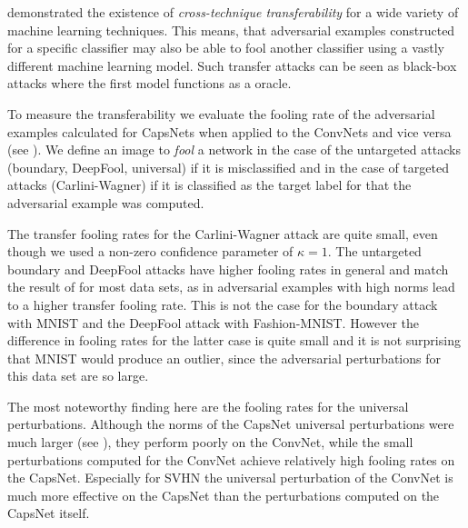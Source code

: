 \citet{transfer} demonstrated the existence of \emph{cross-technique transferability} for a wide variety of machine learning techniques. This means, that adversarial examples constructed for a specific classifier may also be able to fool another classifier using a vastly different machine learning model. Such transfer attacks can be seen as black-box attacks where the first model functions as a oracle.

To measure the transferability we evaluate the fooling rate of the adversarial examples calculated for CapsNets when applied to the ConvNets and vice versa (see ). We define an image to \emph{fool} a network in the case of the untargeted attacks (boundary, DeepFool, universal) if it is misclassified and in the case of targeted attacks (Carlini-Wagner) if it is classified as the target label for that the adversarial example was computed. 

The transfer fooling rates for the Carlini-Wagner attack are quite small, even though we used a non-zero confidence parameter of $\kappa=1$.
The untargeted boundary and DeepFool attacks have higher fooling rates in general and match the result of  for most data sets, as in adversarial examples with high norms lead to a higher transfer fooling rate.
This is not the case for the boundary attack with MNIST and the DeepFool attack with Fashion-MNIST. However the difference in fooling rates for the latter case is quite small and it is not surprising that MNIST would produce an outlier, since the adversarial perturbations for this data set are so large. 


The most noteworthy finding here are the fooling rates for the universal perturbations.
Although the norms of the CapsNet universal perturbations were much larger (see ), they perform poorly on the ConvNet, while the small perturbations computed for the ConvNet achieve relatively high fooling rates on the CapsNet.
Especially for SVHN the universal perturbation of the ConvNet is much more effective on the CapsNet than the perturbations computed on the CapsNet itself.

